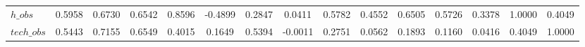 \begin{center}
\begin{longtable}{lcccccccccccccc}
$h\_obs         $	 & 	           0.5958	 & 	           0.6730	 & 	           0.6542	 & 	           0.8596	 & 	          -0.4899	 & 	           0.2847	 & 	           0.0411	 & 	           0.5782	 & 	           0.4552	 & 	           0.6505	 & 	           0.5726	 & 	           0.3378	 & 	           1.0000	 & 	           0.4049 \\ 
$tech\_obs      $	 & 	           0.5443	 & 	           0.7155	 & 	           0.6549	 & 	           0.4015	 & 	           0.1649	 & 	           0.5394	 & 	          -0.0011	 & 	           0.2751	 & 	           0.0562	 & 	           0.1893	 & 	           0.1160	 & 	           0.0416	 & 	           0.4049	 & 	           1.0000 \\ 
\end{longtable}
 \end{center}
